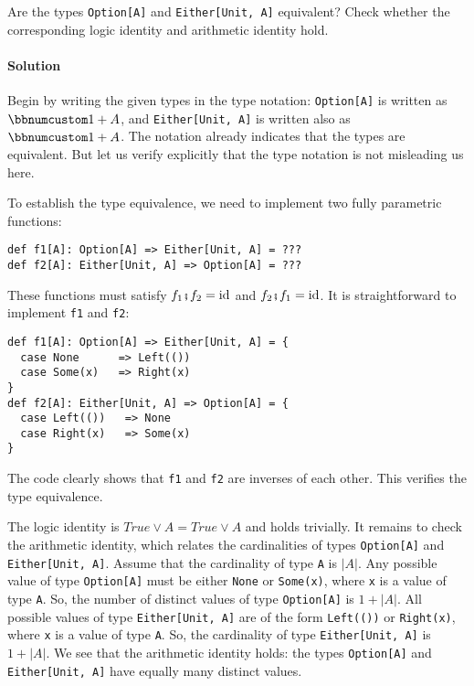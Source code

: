 Are the types \lstinline!Option[A]! and \lstinline!Either[Unit, A]!
equivalent? Check whether the corresponding logic identity and arithmetic
identity hold.

\paragraph{Solution}

Begin by writing the given types in the type notation: \lstinline!Option[A]!
is written as $\bbnum 1+A$, and \lstinline!Either[Unit, A]! is written
also as $\bbnum 1+A$. The notation already indicates that the types
are equivalent. But let us verify explicitly that the type notation
is not misleading us here.

To establish the type equivalence, we need to implement two fully
parametric functions:
\begin{lstlisting}
def f1[A]: Option[A] => Either[Unit, A] = ???
def f2[A]: Either[Unit, A] => Option[A] = ???
\end{lstlisting}
These functions must satisfy $f_{1}\bef f_{2}=\text{id}$ and $f_{2}\bef f_{1}=\text{id}$.
It is straightforward to implement \lstinline!f1! and \lstinline!f2!:
\begin{lstlisting}
def f1[A]: Option[A] => Either[Unit, A] = {
  case None      => Left(())
  case Some(x)   => Right(x)
}
def f2[A]: Either[Unit, A] => Option[A] = {
  case Left(())   => None
  case Right(x)   => Some(x)
}
\end{lstlisting}
The code clearly shows that \lstinline!f1! and \lstinline!f2! are
inverses of each other. This verifies the type equivalence.

The logic identity is $True\vee A=True\vee A$ and holds trivially.
It remains to check the arithmetic identity, which relates the cardinalities
of types \lstinline!Option[A]! and \lstinline!Either[Unit, A]!.
Assume that the cardinality of type \lstinline!A! is $\left|A\right|$.
Any possible value of type \lstinline!Option[A]! must be either \lstinline!None!
or \lstinline!Some(x)!, where \lstinline!x! is a value of type \lstinline!A!.
So, the number of distinct values of type \lstinline!Option[A]! is
$1+\left|A\right|$. All possible values of type \lstinline!Either[Unit, A]!
are of the form \lstinline!Left(())! or \lstinline!Right(x)!, where
\lstinline!x! is a value of type \lstinline!A!. So, the cardinality
of type \lstinline!Either[Unit, A]! is $1+\left|A\right|$. We see
that the arithmetic identity holds: the types \lstinline!Option[A]!
and \lstinline!Either[Unit, A]! have equally many distinct values.

